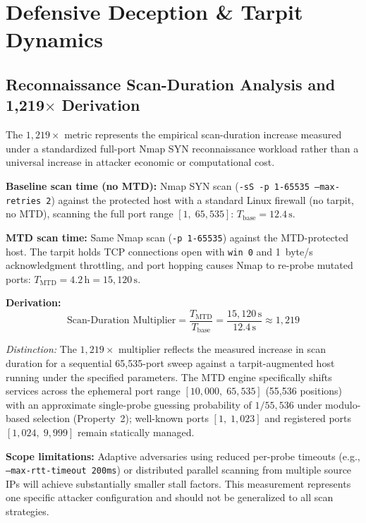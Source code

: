 \documentclass{ieeeaccess}
\renewcommand{\_}{\textunderscore\allowbreak}
\begin{document}
\section{Defensive Deception \& Tarpit Dynamics}
\subsection{Reconnaissance Scan-Duration Analysis and 1,219$\times$ Derivation}
The $1{,}219\times$ metric represents the empirical scan-duration increase measured
under a standardized full-port Nmap SYN reconnaissance workload rather than a universal
increase in attacker economic or computational cost.

\textbf{Baseline scan time (no MTD):} Nmap SYN scan
(\texttt{-sS -p 1-65535 --max-retries 2}) against the protected host with a
standard Linux firewall (no tarpit, no MTD), scanning the full port range
$[1,\; 65{,}535]$: $T_{\text{base}} = 12.4\,\text{s}$.

\textbf{MTD scan time:} Same Nmap scan (\texttt{-p 1-65535}) against the
MTD-protected host. The tarpit holds TCP connections open with \texttt{win~0}
and 1~byte/s acknowledgment throttling, and port hopping causes Nmap to
re-probe mutated ports: $T_{\text{MTD}} = 4.2\,\text{h} = 15{,}120\,\text{s}$.

\textbf{Derivation:}
\begin{equation}
  \text{Scan-Duration Multiplier} = \frac{T_{\text{MTD}}}{T_{\text{base}}}
    = \frac{15{,}120\,\text{s}}{12.4\,\text{s}} \approx 1{,}219
  \label{eq:mtd_cost}
\end{equation}

\textit{Distinction:} The $1{,}219\times$ multiplier reflects the measured increase in
scan duration for a sequential 65,535-port sweep against a tarpit-augmented host running
under the specified parameters. The MTD engine specifically shifts services across the
ephemeral port range $[10{,}000,\; 65{,}535]$ (55{,}536 positions) with an approximate
single-probe guessing probability of $1/55{,}536$ under modulo-based selection (Property~2);
well-known ports $[1,\; 1{,}023]$ and registered ports $[1{,}024,\; 9{,}999]$ remain statically managed.

\textbf{Scope limitations:} Adaptive adversaries using reduced per-probe timeouts
(e.g., \texttt{--max-rtt-timeout 200ms}) or distributed parallel scanning from multiple
source IPs will achieve substantially smaller stall factors. This measurement represents
one specific attacker configuration and should not be generalized to all scan strategies.
\end{document}
